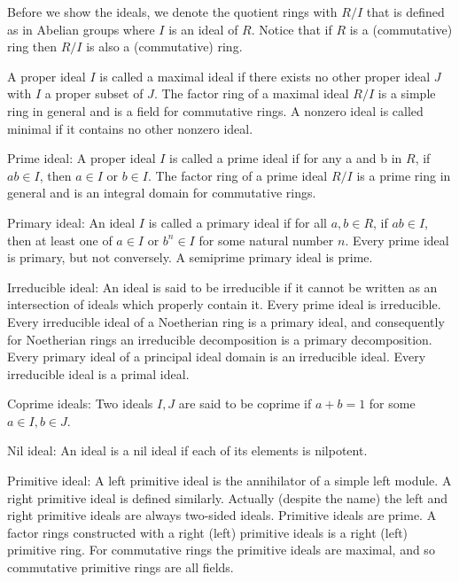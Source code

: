 \documentclass[11pt,a4paper,fleqn]{article}
\begin{document}
Before we show the ideals, we denote the quotient rings with $R/I$ that is defined as in Abelian groups where $I$ is an ideal of $R$. Notice that if $R$ is a (commutative) ring then $R/I$ is also a (commutative) ring.
\begin{definition}
A proper ideal $I$ is called a maximal ideal if there exists no other proper ideal $J$ with $I$ a proper subset of $J$. The factor ring of a maximal ideal $R/I$ is a simple ring in general and is a field for commutative rings. A nonzero ideal is called minimal if it contains no other nonzero ideal.

Prime ideal: A proper ideal $I$ is called a prime ideal if for any a and b in $R$, if $ab\in I$, then $a\in I$ or $b\in I$. The factor ring of a prime ideal $R/I$ is a prime ring in general and is an integral domain for commutative rings.

Primary ideal: An ideal $I$ is called a primary ideal if for all $a,b\in R$, if $ab \in I$, then at least one of $a\in I$ or $b^n\in I$ for some natural number $n$. Every prime ideal is primary, but not conversely. A semiprime primary ideal is prime.

Irreducible ideal: An ideal is said to be irreducible if it cannot be written as an intersection of ideals which properly contain it. Every prime ideal is irreducible. Every irreducible ideal of a Noetherian ring is a primary ideal, and consequently for Noetherian rings an irreducible decomposition is a primary decomposition. Every primary ideal of a principal ideal domain is an irreducible ideal. Every irreducible ideal is a primal ideal.

Coprime ideals: Two ideals $I,J$ are said to be coprime if $a+b=1$ for some $a\in I,b\in J$.

Nil ideal: An ideal is a nil ideal if each of its elements is nilpotent.
\end{definition}

\begin{remark}
Primitive ideal: A left primitive ideal is the annihilator of a simple left module. A right primitive ideal is defined similarly. Actually (despite the name) the left and right primitive ideals are always two-sided ideals. Primitive ideals are prime. A factor rings constructed with a right (left) primitive ideals is a right (left) primitive ring. For commutative rings the primitive ideals are maximal, and so commutative primitive rings are all fields.
\end{remark}
\end{document}
